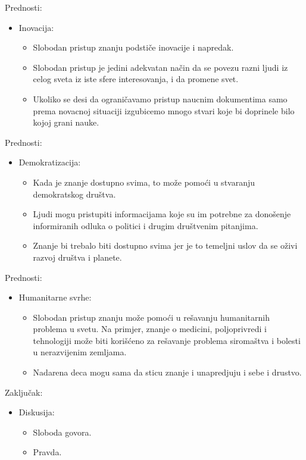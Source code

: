 \documentclass[aspectratio=1610,17pt,utf8]{beamer}
\begin{document}
	\begin{frame}{Prednosti:}
		
		\begin{itemize}
			\item Inovacija:
			\begin{itemize}
				\item Slobodan pristup znanju podstiče inovacije i napredak.
				\item Slobodan pristup je jedini adekvatan način da se povezu razni ljudi iz celog sveta iz iste sfere interesovanja, i da promene svet.
				\item Ukoliko se desi da ograničavamo pristup naucnim dokumentima samo prema novacnoj situaciji izgubicemo mnogo stvari koje bi doprinele bilo kojoj grani nauke.
			\end{itemize}
		\end{itemize}
	\end{frame}
	
	\begin{frame}{Prednosti:}
		
		\begin{itemize}
			\item Demokratizacija:
			\begin{itemize}
				\item Kada je znanje dostupno svima, to može pomoći u stvaranju demokratskog društva.
				\item Ljudi mogu pristupiti informacijama koje su im potrebne za donošenje informiranih odluka o politici i drugim društvenim pitanjima.
				\item Znanje bi trebalo biti dostupno svima jer je to temeljni uslov da se oživi razvoj društva i planete.
				
			\end{itemize}
		\end{itemize}
	\end{frame}
	
	
	\begin{frame}{Prednosti:}
		
		\begin{itemize}
			\item Humanitarne svrhe:
			\begin{itemize}
				\item Slobodan pristup znanju može pomoći u rešavanju humanitarnih problema u svetu. Na primjer, znanje o medicini, poljoprivredi i tehnologiji može biti korišćeno za rešavanje problema siromaštva i bolesti u nerazvijenim zemljama.
				\item Nadarena deca mogu sama da sticu znanje i unapredjuju i sebe i drustvo.
				
				
			\end{itemize}
		\end{itemize}
	\end{frame}
	
	
	\begin{frame}{Zaključak:}
		
		\begin{itemize}
			\item Diskusija:
			\begin{itemize}
				\item Sloboda govora.
				\item Pravda.
				
				
			\end{itemize}
		\end{itemize}
	\end{frame}
	
	
	
\end{document}
